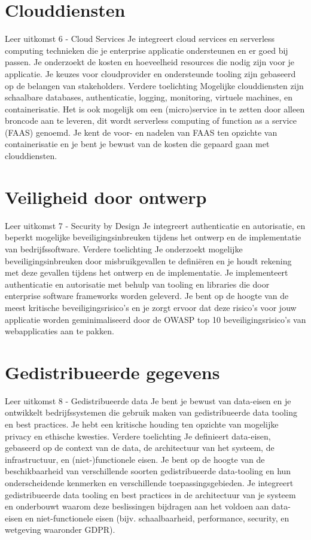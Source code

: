 \section{Clouddiensten}\label{sec:clouddiensten}
Leer uitkomst 6 - Cloud Services Je integreert cloud services en serverless computing technieken die je enterprise applicatie ondersteunen en er goed bij passen.
Je onderzoekt de kosten en hoeveelheid resources die nodig zijn voor je applicatie.
Je keuzes voor cloudprovider en ondersteunde tooling zijn gebaseerd op de belangen van stakeholders.
Verdere toelichting Mogelijke clouddiensten zijn schaalbare databases, authenticatie, logging, monitoring, virtuele machines, en containerisatie.
Het is ook mogelijk om een (micro)service in te zetten door alleen broncode aan te leveren, dit wordt serverless computing of function as a service (FAAS) genoemd.
Je kent de voor- en nadelen van FAAS ten opzichte van containerisatie en je bent je bewust van de kosten die gepaard gaan met clouddiensten.






\section{Veiligheid door ontwerp}\label{sec:veiligheid-door-ontwerp}
Leer uitkomst 7 - Security by Design Je integreert authenticatie en autorisatie, en beperkt mogelijke beveiligingsinbreuken tijdens het ontwerp en de implementatie van bedrijfssoftware.
Verdere toelichting Je onderzoekt mogelijke beveiligingsinbreuken door misbruikgevallen te definiëren en je houdt rekening met deze gevallen tijdens het ontwerp en de implementatie.
Je implementeert authenticatie en autorisatie met behulp van tooling en libraries die door enterprise software frameworks worden geleverd.
Je bent op de hoogte van de meest kritische beveiligingsrisico's en je zorgt ervoor dat deze risico's voor jouw
applicatie worden geminimaliseerd door de OWASP top 10 beveiligingsrisico's van webapplicaties aan te pakken.







\section{Gedistribueerde gegevens}\label{sec:gedistribueerde-gegevens}
Leer uitkomst 8 - Gedistribueerde data Je bent je bewust van data-eisen en je ontwikkelt bedrijfssystemen die gebruik maken van gedistribueerde data tooling en best practices.
Je hebt een kritische houding ten opzichte van mogelijke privacy en ethische kwesties.
Verdere toelichting Je definieert data-eisen, gebaseerd op de context van de data, de architectuur van het systeem, de infrastructuur, en (niet-)functionele eisen.
Je bent op de hoogte van de beschikbaarheid van verschillende soorten gedistribueerde data-tooling en hun onderscheidende kenmerken en verschillende toepassingsgebieden.
Je integreert gedistribueerde data tooling en best practices in de architectuur van je systeem en onderbouwt waarom deze beslissingen bijdragen aan het voldoen aan data-eisen en niet-functionele eisen (bijv.
schaalbaarheid, performance, security, en wetgeving waaronder GDPR).
